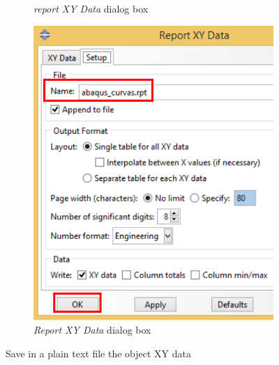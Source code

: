 \begin{itemize}
\begin{figure}[!h]
\begin{subfigure}[!h]{0.37\textwidth}
      \caption{\textit{report XY Data} dialog box}
      \label{post20}
    \end{subfigure}%
    \begin{subfigure}[!h]{0.37\textwidth}
      \includegraphics[width=\textwidth]{./body/images/post21.pdf}
      \caption{\textit{Report XY Data} dialog box}
      \label{post21}
    \end{subfigure}%
    \caption{Save in a plain text file the object XY data}
  \end{figure}


\end{itemize}
